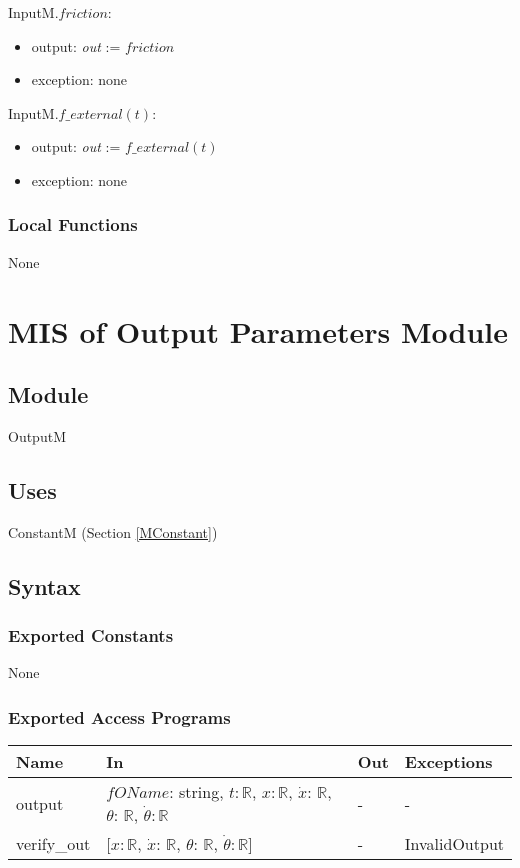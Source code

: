 \documentclass[12pt, titlepage]{article}
\begin{document}
\noindent InputM.$friction$:
\begin{itemize}
\item output: \textit{out} := $friction$
\item exception: none
\end{itemize}\noindent 

\noindent InputM.$f\_external(t)$:
\begin{itemize}
\item output: \textit{out} := $f\_external(t)$
\item exception: none
\end{itemize}\noindent 


\subsubsection{Local Functions}
None

\newpage
\section{MIS of Output Parameters Module\label{MOutput} }


\subsection{Module}
OutputM

\subsection{Uses}
ConstantM (Section \ref{MConstant})

\subsection{Syntax}

\subsubsection{Exported Constants}
None
\subsubsection{Exported Access Programs}

\begin{center}
\begin{tabular}{p{2cm} p{8cm} p{2cm} p{2cm}}
\hline
\textbf{Name} & \textbf{In} & \textbf{Out} & \textbf{Exceptions} \\
\hline
 output& $fOName$: string, $t$$: \mathbb{R}$, $x$$: \mathbb{R}$, $\dot{x}$: $\mathbb{R}$, $\theta$: $\mathbb{R}$, $\dot{\theta}$$: 
 \mathbb{R}$ & - & -\\
\hline
verify\_out&  [$x$$: \mathbb{R}$, $\dot{x}$: $\mathbb{R}$, $\theta$: $\mathbb{R}$, $\dot{\theta}$$: 
 \mathbb{R}$] & - & InvalidOutput \\
\end{tabular}
\end{center}
\end{document}
